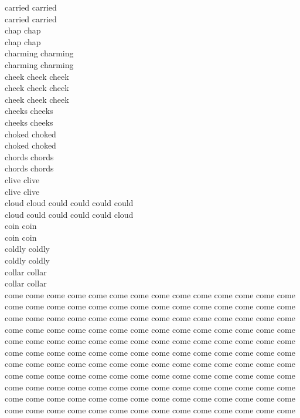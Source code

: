 carried carried\\
carried carried\\
chap chap\\
chap chap\\
charming charming\\
charming charming\\
cheek cheek cheek\\
cheek cheek cheek\\
cheek cheek cheek\\
cheeks cheeks\\
cheeks cheeks\\
choked choked\\
choked choked\\
chords chords\\
chords chords\\
clive clive\\
clive clive\\
cloud cloud could could could could\\
cloud could could could could cloud\\
coin coin\\
coin coin\\
coldly coldly\\
coldly coldly\\
collar collar\\
collar collar\\
come come come come come come come come come come come come come come\\
come come come come come come come come come come come come come come\\
come come come come come come come come come come come come come come\\
come come come come come come come come come come come come come come\\
come come come come come come come come come come come come come come\\
come come come come come come come come come come come come come come\\
come come come come come come come come come come come come come come\\
come come come come come come come come come come come come come come\\
come come come come come come come come come come come come come come\\
come come come come come come come come come come come come come come\\
come come come come come come come come come come come come come come\\
